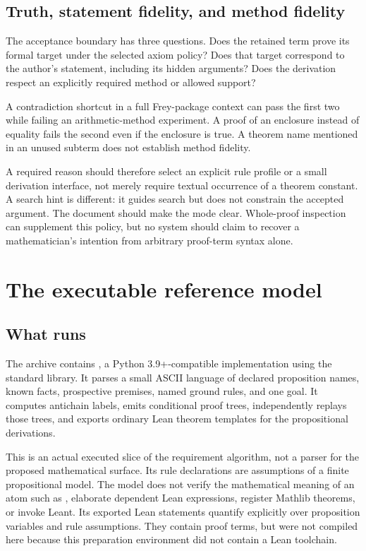 \documentclass[11pt,a4paper]{article}
\newcommand{\code}[1]{\texttt{\detokenize{#1}}}
\theoremstyle{definition}\newtheorem{definition}[theorem]{Definition}
\theoremstyle{remark}\newtheorem{remark}[theorem]{Remark}
\begin{document}
\subsection{Truth, statement fidelity, and method fidelity}
The acceptance boundary has three questions. Does the retained term prove its formal target under the selected axiom policy? Does that target correspond to the author's statement, including its hidden arguments? Does the derivation respect an explicitly required method or allowed support?

A contradiction shortcut in a full Frey-package context can pass the first two while failing an arithmetic-method experiment. A proof of an enclosure instead of equality fails the second even if the enclosure is true. A theorem name mentioned in an unused subterm does not establish method fidelity.

A required reason should therefore select an explicit rule profile or a small derivation interface, not merely require textual occurrence of a theorem constant. A search hint is different: it guides search but does not constrain the accepted argument. The document should make the mode clear. Whole-proof inspection can supplement this policy, but no system should claim to recover a mathematician's intention from arbitrary proof-term syntax alone.

\section{The executable reference model}\label{sec:prototype}

\subsection{What runs}
The archive contains \code{prototype/bryony.py}, a Python 3.9+-compatible implementation using the standard library. It parses a small ASCII language of declared proposition names, known facts, prospective premises, named ground rules, and one goal. It computes antichain labels, emits conditional proof trees, independently replays those trees, and exports ordinary Lean theorem templates for the propositional derivations.

This is an actual executed slice of the requirement algorithm, not a parser for the proposed mathematical surface. Its rule declarations are assumptions of a finite propositional model. The model does not verify the mathematical meaning of an atom such as \code{NumeratorExact}, elaborate dependent Lean expressions, register Mathlib theorems, or invoke Leant. Its exported Lean statements quantify explicitly over proposition variables and rule assumptions. They contain proof terms, but were not compiled here because this preparation environment did not contain a Lean toolchain.
\end{document}
